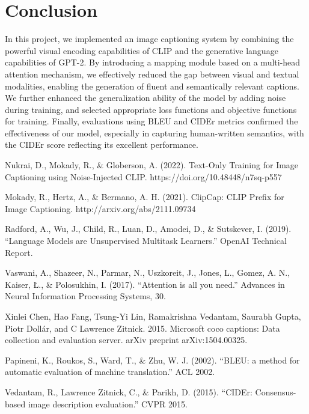 \documentclass[11pt]{article}
\begin{document}
\section{Conclusion}
In this project, we implemented an image captioning 
system by combining the powerful visual encoding capabilities 
of CLIP and the generative language capabilities of GPT-2. By 
introducing a mapping module based on a multi-head attention 
mechanism, we effectively reduced the gap between visual and 
textual modalities, enabling the generation of fluent and 
semantically relevant captions. We further enhanced the 
generalization ability of the model by adding noise during training, and selected appropriate loss functions and objective functions for training. Finally, evaluations using BLEU and CIDEr metrics confirmed the effectiveness of our model, especially in capturing human-written semantics, with the CIDEr score reflecting its excellent performance.


\pagebreak
\begin{thebibliography}{99}
    Nukrai, D., Mokady, R., \& Globerson, A. (2022). Text-Only Training for Image Captioning using Noise-Injected CLIP. https://doi.org/10.48448/n7sq-p557
    
    Mokady, R., Hertz, A., \& Bermano, A. H. (2021). ClipCap: CLIP Prefix for Image Captioning. http://arxiv.org/abs/2111.09734
    
    Radford, A., Wu, J., Child, R., Luan, D., Amodei, D., \& Sutskever, I. (2019). ``Language Models are Unsupervised Multitask Learners.'' OpenAI Technical Report.

    Vaswani, A., Shazeer, N., Parmar, N., Uszkoreit, J., Jones, L., Gomez, A. N., Kaiser, Ł., \& Polosukhin, I. (2017). ``Attention is all you need.'' 
    Advances in Neural Information Processing Systems, 30.

    Xinlei Chen, Hao Fang, Tsung-Yi Lin, Ramakrishna Vedantam, Saurabh Gupta, Piotr Dollár, and C Lawrence Zitnick. 2015. Microsoft coco captions: Data collection and evaluation server. arXiv preprint arXiv:1504.00325.
    
    Papineni, K., Roukos, S., Ward, T., \& Zhu, W. J. (2002). ``BLEU: a method for automatic evaluation of machine translation.'' ACL 2002.
    
    Vedantam, R., Lawrence Zitnick, C., \& Parikh, D. (2015). ``CIDEr: Consensus-based image description evaluation.'' CVPR 2015.
    
    \end{thebibliography}
\end{document}
